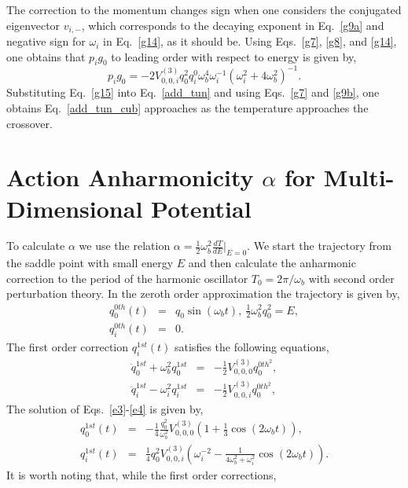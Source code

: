 \documentclass[journal=jpcafh,manuscript=article]{achemso}
\begin{document}
The correction to the momentum changes sign when one considers the
conjugated eigenvector $v_{i,-}$, which corresponds to the decaying
exponent in Eq.~\ref{g9a} and negative sign for $\omega_i$ in
Eq.~\ref{g14}, as it should be. Using Eqs.~\ref{g7}, \ref{g8}, and
\ref{g14}, one obtains that $p_ig_0$ to leading order with respect to
energy is given by,
\begin{equation}
  \label{g15}
  p_ig_0=-2V^{(3)}_{0,0,i}q_0^2q_i^0\omega_b^4\omega_i^{-1}(\omega_i^2+4\omega_b^2)^{-1}.
\end{equation}
Substituting Eq.~\ref{g15} into Eq.~\ref{add_tun} and using
Eqs.~\ref{g7} and \ref{g9b}, one obtains Eq.~\ref{add_tun_cub}
approaches as the temperature approaches the crossover.

\setcounter{equation}{0}
\section{Action Anharmonicity $\alpha$ for Multi-Dimensional
  Potential}
To calculate $\alpha$ we use the relation
$\alpha=\frac{1}{2}\omega_b^2\frac{dT}{dE}|_{E=0}$. We start the
trajectory from the saddle point with small energy $E$ and then
calculate the anharmonic correction to the period of the harmonic
oscillator $T_0=2\pi/\omega_b$ with second order perturbation
theory. In the zeroth order approximation the trajectory is given by,
\begin{eqnarray}
  \label{e2}
  q^{0th}_0(t)&=&q_0\sin(\omega_bt),\ \frac{1}{2}\omega_b^2q_0^2=E,
  \\
  \nonumber
  q^{0th}_i(t)&=&0.
\end{eqnarray}
The first order correction $q^{1st}_i(t)$ satisfies the following
equations,
\begin{eqnarray}
  \label{e3}
  \ddot{q}_0^{1st}+\omega_b^2q^{1st}_0&=&-\frac{1}{2}V_{0,0,0}^{(3)}q_0^{0th^2},
  \\
  \label{e4}
  \ddot{q}_i^{1st}-\omega_i^2q^{1st}_i&=&-\frac{1}{2}V_{0,0,i}^{(3)}q_0^{0th^2},  
\end{eqnarray}
The solution of Eqs.~\ref{e3}-\ref{e4} is given by,
\begin{eqnarray}
  \label{e5}
  q^{1st}_0(t)&=&-\frac{1}{4}\frac{q_0^2}{\omega_b^2}V_{0,0,0}^{(3)}(1+\frac{1}{3}\cos(2\omega_bt)),
  \\
  \label{e6}
  q^{1st}_i(t)&=&\frac{1}{4}q_0^2V_{0,0,i}^{(3)}(\omega_i^{-2}-\frac{1}{4\omega_b^2+\omega_i^2}\cos(2\omega_bt)).
\end{eqnarray}
It is worth noting that, while the first order corrections,
\end{document}
